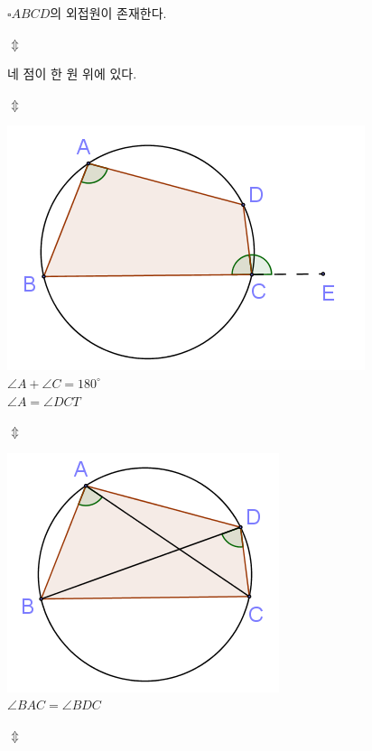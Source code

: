 \documentclass[twocolumn]{article}
\begin{document}
\centering
\begin{mdframed}
\(\square ABCD\)의 외접원이 존재한다.
\end{mdframed}

\(\Updownarrow\)

\begin{mdframed}
네 점이 한 원 위에 있다.
\end{mdframed}

\(\Updownarrow\)

\begin{mdframed}
\includegraphics{1}\\
\(\angle A+\angle C=180^\circ\)\\
\(\angle A=\angle DCT\)
\end{mdframed}

\(\Updownarrow\)

\begin{mdframed}
\includegraphics{2}\\
\(\angle BAC=\angle BDC\)
\end{mdframed}

\(\Updownarrow\)
\end{document}
